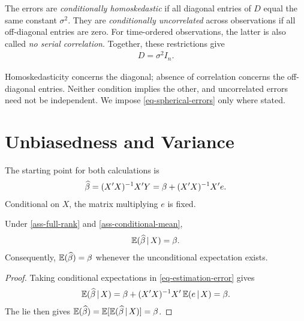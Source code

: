 \documentclass[a4paper,12pt]{article}
\begin{document}
\begin{definition}
	The errors are \emph{conditionally homoskedastic} if all diagonal entries of $D$ equal the same constant $\sigma^2$.
	They are \emph{conditionally uncorrelated} across observations if all off-diagonal entries are zero.
	For time-ordered observations, the latter is also called \emph{no serial correlation}.
	Together, these restrictions give
	\begin{align}\label{eq-spherical-errors}
		D=\sigma^2 I_n.
	\end{align}
\end{definition}

\begin{remark}
	Homoskedasticity concerns the diagonal; absence of correlation concerns the off-diagonal entries.
	Neither condition implies the other, and uncorrelated errors need not be independent.
	We impose \eqref{eq-spherical-errors} only where stated.
\end{remark}

\section{Unbiasedness and Variance}

The starting point for both calculations is
\begin{align}\label{eq-estimation-error}
	\widehat\beta
	=(X^{\prime} X)^{-1} X^{\prime} Y
	=\beta+(X^{\prime} X)^{-1} X^{\prime} e.
\end{align}
Conditional on $X$, the matrix multiplying $e$ is fixed.

\begin{proposition}
	Under \autoref{ass-full-rank} and \ref{ass-conditional-mean},
	\begin{align}
		\operatorname{\mathbb{E}}(\widehat\beta\mathpunct{}|\mathpunct{} X)=\beta.
	\end{align}
	Consequently, $\operatorname{\mathbb{E}}(\widehat\beta)=\beta$ whenever the unconditional expectation exists.
\end{proposition}
\begin{proof}
	Taking conditional expectations in \eqref{eq-estimation-error} gives
	\begin{align*}
		\operatorname{\mathbb{E}}(\widehat\beta\mathpunct{}|\mathpunct{} X)
		=\beta+(X^{\prime} X)^{-1} X^{\prime}\operatorname{\mathbb{E}}(e\mathpunct{}|\mathpunct{} X)=\beta.
	\end{align*}
	The \gls{lie} then gives $\operatorname{\mathbb{E}}(\widehat\beta)=\operatorname{\mathbb{E}}[\operatorname{\mathbb{E}}(\widehat\beta\mathpunct{}|\mathpunct{} X)]=\beta$.
\end{proof}
\end{document}

